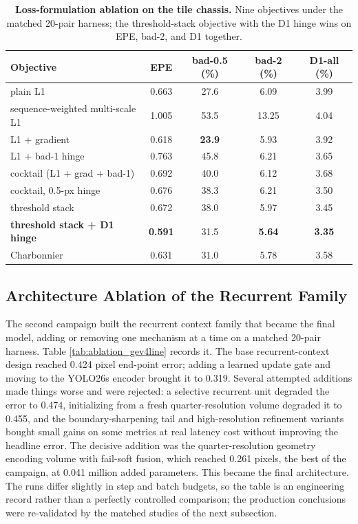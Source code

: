 \begin{table}[!htbp]
\centering
\caption{\textbf{Loss-formulation ablation on the tile chassis.} Nine objectives under the matched 20-pair harness; the threshold-stack objective with the D1 hinge wins on EPE, bad-2, and D1 together.}
\label{tab:ablation_loss}
\small
\begin{tabular}{lcccc}
\toprule
Objective & EPE & bad-0.5 (\%) & bad-2 (\%) & D1-all (\%)\\
\midrule
plain L1 & 0.663 & 27.6 & 6.09 & 3.99\\
sequence-weighted multi-scale L1 & 1.005 & 53.5 & 13.25 & 4.04\\
L1 + gradient & 0.618 & \textbf{23.9} & 5.93 & 3.92\\
L1 + bad-1 hinge & 0.763 & 45.8 & 6.21 & 3.65\\
cocktail (L1 + grad + bad-1) & 0.692 & 40.0 & 6.12 & 3.68\\
cocktail, 0.5-px hinge & 0.676 & 38.3 & 6.21 & 3.50\\
threshold stack & 0.672 & 38.0 & 5.97 & 3.45\\
\textbf{threshold stack + D1 hinge} & \textbf{0.591} & 31.5 & \textbf{5.64} & \textbf{3.35}\\
Charbonnier & 0.631 & 31.0 & 5.78 & 3.58\\
\bottomrule
\end{tabular}
\end{table}

\subsection{Architecture Ablation of the Recurrent Family}
The second campaign built the recurrent context family that became the
final model, adding or removing one mechanism at a time on a matched
20-pair harness. Table \ref{tab:ablation_gev4line} records it. The base
recurrent-context design reached 0.424 pixel end-point error; adding a
learned update gate and moving to the YOLO26s encoder brought it to
0.319. Several attempted additions made things worse and were rejected:
a selective recurrent unit degraded the error to 0.474, initializing
from a fresh quarter-resolution volume degraded it to 0.455, and the
boundary-sharpening tail and high-resolution refinement variants bought
small gains on some metrics at real latency cost without improving the
headline error. The decisive addition was the quarter-resolution
geometry encoding volume with fail-soft fusion, which reached 0.261
pixels, the best of the campaign, at 0.041 million added parameters.
This became the final architecture. The runs differ slightly in step and
batch budgets, so the table is an engineering record rather than a
perfectly controlled comparison; the production conclusions were
re-validated by the matched studies of the next subsection.

